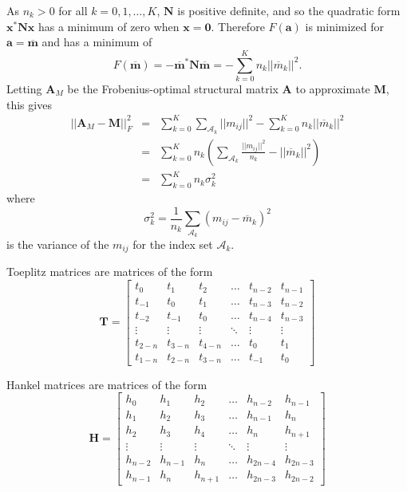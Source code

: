\documentclass[letterpaper,12pt,oneside,final]{article}
\newcommand{\ve}[1]{\mathbf{#1}}           %
\newcommand{\m}[1]{\mathbf{#1}}               %
\newcommand{\conj}[1]{{#1}^{\ast}}
\newcommand{\norm}[1]{||{#1}||}              %
\newcommand{\frob}[1]{\norm{#1}_F}
\newcommand{\widebar}[1]{\overline{#1}}
\begin{document}
As $n_k > 0$ for all $k = 0, 1, \dots, K$, $\m{N}$ is positive definite, and so the quadratic form $\conj{ \ve{x} } \m{N} \ve{x}$ has a minimum of zero when $\ve{x} = \ve{0}$. Therefore $F(\ve{a})$ is minimized for $\ve{a} = \widebar{ \ve{ m } }$ and has a minimum of
\begin{equation} \label{eq:Fmin}
  F(\widebar{ \ve{m} }) = - \conj{ \widebar{ \ve{m} } } \m{N} \widebar{ \ve{m} } = - \sum_{k = 0}^K n_k \norm{\widebar{m}_k}^2.
\end{equation}
Letting $\m{A}_M$ be the Frobenius-optimal structural matrix $\m{A}$ to approximate $\m{M}$, this gives
\begin{eqnarray}
  \frob{\m{A}_M - \m{M}}^2 & = & \sum_{k = 0}^K \sum_{\mathcal{A}_k} \norm{m_{ij}}^2 - \sum_{k = 0}^K n_k \norm{\widebar{m}_k}^2 \nonumber \\
  & = & \sum_{k = 0}^K n_k \left ( \sum_{\mathcal{A}_k} \frac{\norm{m_{ij}}^2}{n_k} - \norm{\widebar{m}_k}^2  \right )\\
  & = & \sum_{k = 0}^K n_k \sigma_k^2 \label{eq:AMmin}
\end{eqnarray}
where
$$\sigma_k^2 = \frac{1}{n_k} \sum_{\mathcal{A}_k} \left ( m_{ij} - \widebar{m}_k \right ) ^2$$
is the variance of the $m_{ij}$ for the index set $\mathcal{A}_k$.


Toeplitz matrices are matrices of the form
\begin{equation} \label{eq:toepdefn}
  \m{T} = \begin{bmatrix}
    t_0 & t_1 & t_2 & \dots & t_{n-2} & t_{n-1} \\
    t_{-1} & t_0 & t_1 & \dots & t_{n-3} & t_{n-2} \\
    t_{-2} & t_{-1} & t_0 & \dots & t_{n-4} & t_{n-3} \\
    \vdots & \vdots & \vdots & \ddots & \vdots & \vdots \\
    t_{2-n} & t_{3-n} & t_{4-n} & \dots & t_0 & t_1 \\
    t_{1-n} & t_{2-n} & t_{3-n} & \dots & t_{-1} & t_0
  \end{bmatrix}
\end{equation}

Hankel matrices are matrices of the form
\begin{equation} \label{eq:toepdefn}
  \m{H} = \begin{bmatrix}
    h_0 & h_1 & h_2 & \dots & h_{n-2} & h_{n-1} \\
    h_1 & h_2 & h_3 & \dots & h_{n-1} & h_n \\
    h_2 & h_3 & h_4 & \dots & h_n & h_{n+1} \\
    \vdots & \vdots & \vdots & \ddots & \vdots & \vdots \\
    h_{n-2} & h_{n-1} & h_{n} & \dots & h_{2n-4} & h_{2n-3} \\
    h_{n-1} & h_{n} & h_{n+1} & \dots & h_{2n-3} & h_{2n-2}
  \end{bmatrix}
\end{equation}



\end{document}
